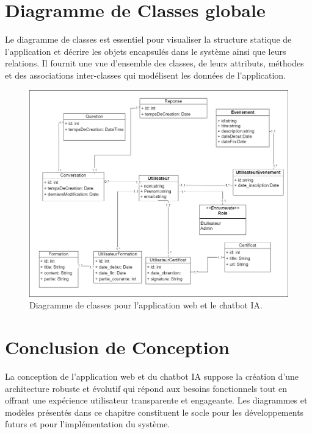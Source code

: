 \documentclass[a4paper, 11pt, openany]{report}
\begin{document}
\section{Diagramme de Classes globale}

Le diagramme de classes est essentiel pour visualiser la structure statique de l'application et décrire les objets encapsulés dans le système ainsi que leurs relations. Il fournit une vue d'ensemble des classes, de leurs attributs, méthodes et des associations inter-classes qui modélisent les données de l'application.

\clearpage
\begin{figure}[h!]
\centering
\includegraphics[width=\textwidth]{images/class.png}
\caption{Diagramme de classes pour l'application web et le chatbot IA.}
\label{fig:class_diagram}
\end{figure}

\section{Conclusion de Conception}
La conception de l'application web et du chatbot IA suppose la création d'une architecture robuste et évolutif qui répond aux besoins fonctionnels tout en offrant une expérience utilisateur transparente et engageante. Les diagrammes et modèles présentés dans ce chapitre constituent le socle pour les développements futurs et pour l'implémentation du système.

\end{document}
